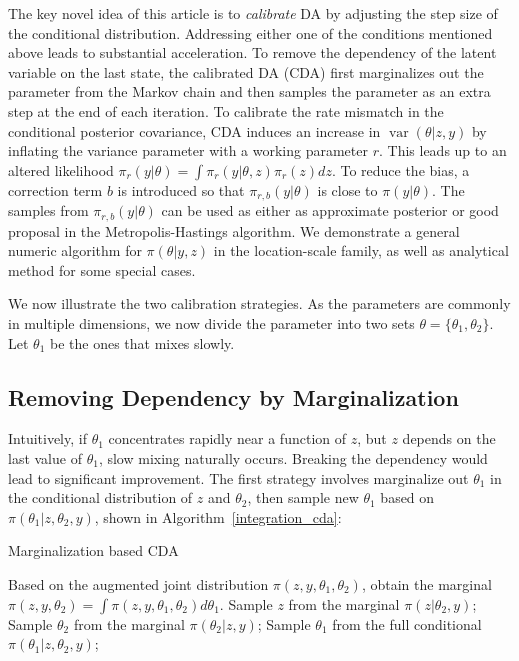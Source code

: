 \documentclass[10pt]{article}
\DeclareMathOperator{\var}{var}
\begin{document}
The key novel idea of this article is to {\em calibrate} DA by adjusting the step size of the conditional distribution. Addressing either one of the conditions mentioned above leads to substantial acceleration. To remove the dependency of the latent variable on the last state,  the calibrated DA (CDA) first marginalizes out the parameter from the Markov chain and then samples the parameter as an extra step at the end of each iteration. To calibrate the rate mismatch in the conditional posterior covariance, CDA induces an increase in $\var( \theta | z,y)$ by  inflating the variance parameter with a working parameter $r$. This leads up to an altered likelihood $\pi_r(y|\theta)= \int \pi_r(y|\theta,z)\pi_r(z)dz$. To reduce the bias, a correction term $b$ is introduced so that $\pi_{r,b}(y|\theta)$ is close to $\pi(y|\theta)$. The samples from $\pi_{r,b}(y|\theta)$ can be used as either as approximate posterior or good proposal in the Metropolis-Hastings algorithm. We demonstrate a general numeric algorithm for $\pi(\theta | y,z)$ in the location-scale family, as well as analytical method for some special cases.

We now illustrate the two calibration strategies. As the parameters are commonly in multiple dimensions, we now divide the parameter into two sets $\theta=\{\theta_1,\theta_2 \}$. Let $\theta_1$ be the ones that mixes slowly.



\subsection{Removing Dependency by Marginalization}

Intuitively, if $\theta_1$ concentrates rapidly near a function of $z$, but $z$ depends on the last value of $\theta_1$, slow mixing naturally occurs. Breaking the dependency would lead to significant improvement. The first strategy involves marginalize out $\theta_1$ in the conditional distribution of  $z$ and $\theta_2$, then  sample new $\theta_1$ based on $\pi(\theta_1|z,\theta_2,y)$, shown in Algorithm~\ref{integration_cda}:

\begin{algorithm}[H]
\caption{Marginalization based CDA}
\label{integration_cda}
\begin{algorithmic}
\State Based on the augmented joint distribution $\pi (z,y,\theta_1,\theta_2)$, obtain the marginal $\pi (z,y,\theta_2)=\int\pi (z,y,\theta_1,\theta_2) d\theta_1$.
\State {}
\State Sample $z$ from the marginal $\pi(z|\theta_2, y)$;
\State Sample $\theta_2$ from the marginal $\pi(\theta_2|z, y)$;
\State Sample $\theta_1$ from the full conditional $\pi(\theta_1|z,\theta_2, y)$;
\EndFor
\end{algorithmic}
\end{algorithm}
\end{document}
